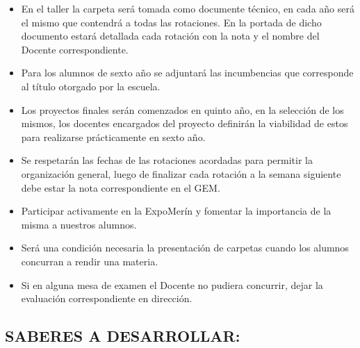 \documentclass[a4paper,12pt]{article}
\begin{document}
\begin{itemize}[itemsep=1pt]
debido a que existen distintos formatos y principalmente para abaratar costos al alumno.
\item En el taller la carpeta será tomada como documente técnico, en cada año será el mismo que contendrá a todas las rotaciones. En la portada
de dicho documento estará detallada cada rotación con la nota y el nombre del Docente correspondiente.
\item Para los alumnos de sexto año se adjuntará las incumbencias que corresponde al título otorgado por la escuela.
\item Los proyectos finales serán comenzados en quinto año, en la selección de los mismos, los docentes encargados del proyecto definirán la
viabilidad de estos para realizarse prácticamente en sexto año.
\item Se respetarán las fechas de las rotaciones acordadas para permitir la organización general, luego de finalizar cada rotación a la
semana siguiente debe estar la nota correspondiente en el GEM.
\item Participar activamente en la ExpoMerín y fomentar la importancia de la misma a nuestros alumnos.
\item Será una condición necesaria la presentación de carpetas cuando los alumnos concurran a rendir una materia.
\item Si en alguna mesa de examen el Docente no pudiera concurrir, dejar la evaluación correspondiente en dirección.
 \end{itemize}

\subsection*{SABERES A DESARROLLAR:}
\end{document}
